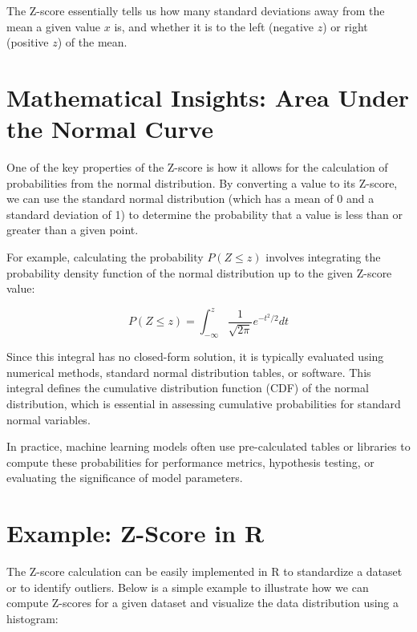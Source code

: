 \documentclass[
  12 pt,
  a4paper,
]{book}
\numberwithin{equation}{section}
\theoremstyle{plain}      %
\theoremstyle{definition} %
\theoremstyle{remark}     %
\theoremstyle{note}         %
\begin{document}
The Z-score essentially tells us how many standard deviations away from
the mean a given value \(x\) is, and whether it is to the left (negative
\(z\)) or right (positive \(z\)) of the mean.

\hypertarget{mathematical-insights-area-under-the-normal-curve}{%
\section{Mathematical Insights: Area Under the Normal
Curve}\label{mathematical-insights-area-under-the-normal-curve}}

One of the key properties of the Z-score is how it allows for the
calculation of probabilities from the normal distribution. By converting
a value to its Z-score, we can use the standard normal distribution
(which has a mean of 0 and a standard deviation of 1) to determine the
probability that a value is less than or greater than a given point.

For example, calculating the probability \(P(Z \le z)\) involves
integrating the probability density function of the normal distribution
up to the given Z-score value:

\[
P(Z \le z) = \int_{-\infty}^{z} \frac{1}{\sqrt{2\pi}} e^{-t^2/2} dt
\]

Since this integral has no closed-form solution, it is typically
evaluated using numerical methods, standard normal distribution tables,
or software. This integral defines the cumulative distribution function
(CDF) of the normal distribution, which is essential in assessing
cumulative probabilities for standard normal variables.

In practice, machine learning models often use pre-calculated tables or
libraries to compute these probabilities for performance metrics,
hypothesis testing, or evaluating the significance of model parameters.

\hypertarget{example-z-score-in-r}{%
\section{Example: Z-Score in R}\label{example-z-score-in-r}}

The Z-score calculation can be easily implemented in R to standardize a
dataset or to identify outliers. Below is a simple example to illustrate
how we can compute Z-scores for a given dataset and visualize the data
distribution using a histogram:

\scriptsize
\end{document}
